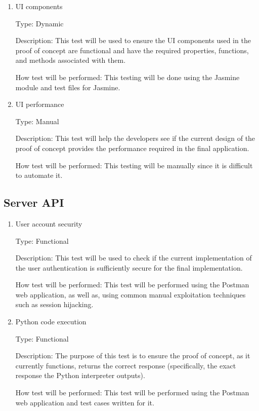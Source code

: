 \documentclass[12pt, titlepage]{article}
\begin{document}
\begin{enumerate}

\item{UI components\\}

Type: Dynamic
					
Description: This test will be used to ensure the UI components used in the
proof of concept are functional and have the required properties, functions,
and methods associated with them.
					
How test will be performed: This testing will be done using the Jasmine module
and test files for Jasmine.
					
\item{UI performance\\}

Type: Manual
					
Description: This test will help the developers see if the current design of
the proof of concept provides the performance required in the final
application.
					
How test will be performed: This testing will be manually since it is difficult
to automate it.

\end{enumerate}

\subsection{Server API}

\begin{enumerate}

\item{User account security\\}

Type: Functional
					
Description: This test will be used to check if the current implementation of
the user authentication is sufficiently secure for the final implementation.
					
How test will be performed: This test will be performed using the Postman web
application, as well as, using common manual exploitation techniques such as
session hijacking.
					
\item{Python code execution\\}

Type: Functional
					
Description: The purpose of this test is to ensure the proof of concept, as it
currently functions, returns the correct response (specifically, the exact
response the Python interpreter outputs).
					
How test will be performed: This test will be performed using the Postman web
application and test cases written for it.

\end{enumerate}
\end{document}
